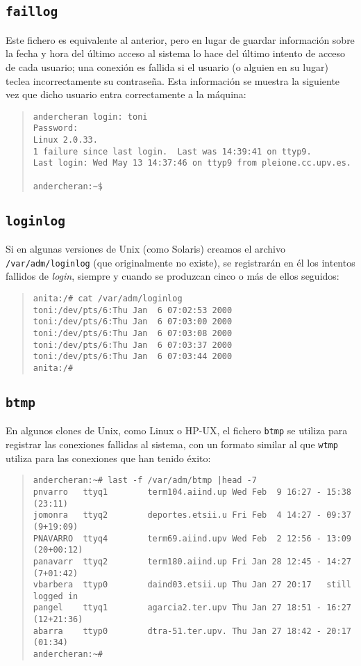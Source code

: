 \subsection{{\tt faillog}}
Este fichero es equivalente al anterior, pero en lugar de guardar informaci\'on
sobre la fecha y hora del \'ultimo acceso al sistema lo hace del \'ultimo
intento de acceso de cada usuario; una conexi\'on es fallida si el usuario
(o alguien en su lugar) teclea incorrectamente su contrase\~na. Esta 
informaci\'on se muestra la siguiente vez que dicho usuario entra correctamente
a la m\'aquina:
\begin{quote}
\begin{verbatim}
andercheran login: toni
Password:
Linux 2.0.33.
1 failure since last login.  Last was 14:39:41 on ttyp9.
Last login: Wed May 13 14:37:46 on ttyp9 from pleione.cc.upv.es.

andercheran:~$
\end{verbatim}
\end{quote}
\subsection{{\tt loginlog}}
Si en algunas versiones de Unix (como Solaris) creamos el archivo 
{\tt /var/adm/loginlog} (que originalmente no existe), se registrar\'an en \'el 
los intentos fallidos de {\it login}, siempre y cuando se produzcan cinco o 
m\'as de ellos seguidos:
\begin{quote}
\begin{verbatim}
anita:/# cat /var/adm/loginlog 
toni:/dev/pts/6:Thu Jan  6 07:02:53 2000
toni:/dev/pts/6:Thu Jan  6 07:03:00 2000
toni:/dev/pts/6:Thu Jan  6 07:03:08 2000
toni:/dev/pts/6:Thu Jan  6 07:03:37 2000
toni:/dev/pts/6:Thu Jan  6 07:03:44 2000
anita:/# 
\end{verbatim}
\end{quote}
\subsection{{\tt btmp}}
En algunos clones de Unix, como Linux o HP-UX, el fichero {\tt btmp} se 
utiliza para
registrar las conexiones fallidas al sistema, con un formato similar al que
{\tt wtmp} utiliza para las conexiones que han tenido \'exito:
\begin{quote}
\begin{verbatim}
andercheran:~# last -f /var/adm/btmp |head -7
pnvarro   ttyq1        term104.aiind.up Wed Feb  9 16:27 - 15:38  (23:11)
jomonra   ttyq2        deportes.etsii.u Fri Feb  4 14:27 - 09:37 (9+19:09)
PNAVARRO  ttyq4        term69.aiind.upv Wed Feb  2 12:56 - 13:09 (20+00:12)
panavarr  ttyq2        term180.aiind.up Fri Jan 28 12:45 - 14:27 (7+01:42)
vbarbera  ttyp0        daind03.etsii.up Thu Jan 27 20:17   still logged in
pangel    ttyq1        agarcia2.ter.upv Thu Jan 27 18:51 - 16:27 (12+21:36)
abarra    ttyp0        dtra-51.ter.upv. Thu Jan 27 18:42 - 20:17  (01:34)
andercheran:~#
\end{verbatim}
\end{quote}
